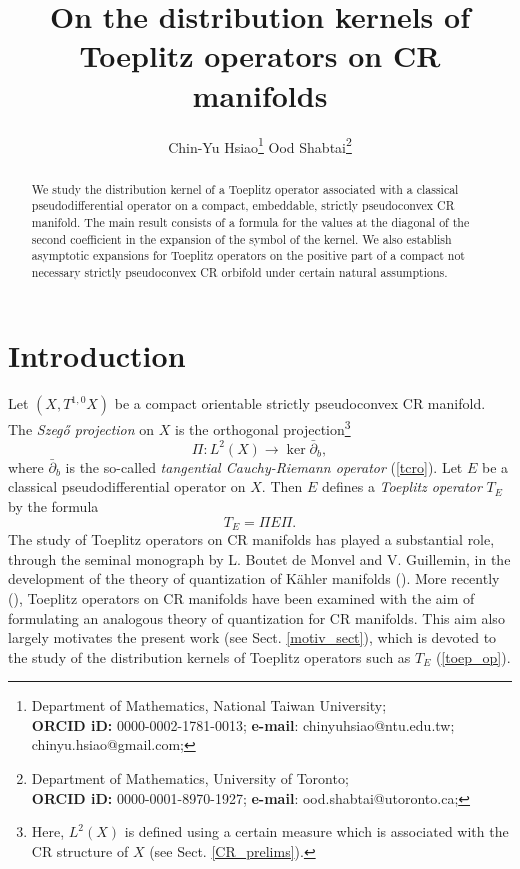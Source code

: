 \documentclass{article}
\title{On the distribution kernels of Toeplitz operators on CR manifolds}
\author{
	Chin-Yu Hsiao\footnote{\noindent{\bf Address:} Department of Mathematics, National Taiwan University; \\ {\bf ORCID iD:} 0000-0002-1781-0013; {\bf e-mail}: chinyuhsiao@ntu.edu.tw; chinyu.hsiao@gmail.com;}
    \text{ and } Ood Shabtai\footnote{\noindent{\bf Address:} Department of Mathematics, University of Toronto; \\ {\bf ORCID iD:}  0000-0001-8970-1927; {\bf e-mail}: ood.shabtai@utoronto.ca;
}}
\begin{document}
%
\maketitle
%
%

%
%
%
\begin{abstract} We study the distribution kernel of a Toeplitz operator associated with a classical pseudodifferential operator on a compact, embeddable, strictly pseudoconvex CR manifold. The main result consists of a formula for the values at the diagonal of the second coefficient in the expansion of the symbol of the kernel. We also establish asymptotic expansions for Toeplitz operators on the positive part of a compact not necessary strictly pseudoconvex CR orbifold under certain natural assumptions.
\end{abstract}
%
%
%
%
%
\tableofcontents
%
\section{Introduction}
%
Let $(X, T^{1,0}X)$ be a compact orientable strictly pseudoconvex CR manifold. The \textit{Szeg\H{o} projection} on $X$ is the orthogonal projection\footnote{Here, $L^2(X)$ is defined using a certain measure which is associated with the CR structure of $X$ (see Sect. \ref{CR_prelims}).} $$\Pi : L^2(X) \to \ker \bar \partial_b,$$
where $\bar \partial_b$ is the so-called \textit{tangential Cauchy-Riemann operator} (\ref{tcro}). Let $E$ be a classical pseudodifferential operator on $X$. Then $E$ defines a \textit{Toeplitz operator} $T_E$ by the formula \begin{equation}\label{toep_op}T_E = \Pi E \Pi.\end{equation}
%
%
The study of Toeplitz operators on CR manifolds has played a substantial role, through the seminal monograph \cite{bdmg} by L. Boutet de Monvel and V. Guillemin, in the development of the theory of quantization of K\"{a}hler manifolds (\cite{bms}). More recently (\cite{gh1, gh2, hhms}), Toeplitz operators on CR manifolds have been examined with the aim of formulating an analogous theory of quantization for CR manifolds. This aim also largely motivates the present work (see Sect. \ref{motiv_sect}), which is devoted to the study of the distribution kernels of Toeplitz operators such as $T_E$ (\ref{toep_op}). 
\end{document}
